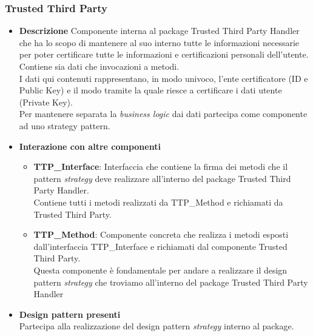 \subsubsection{Trusted Third Party}
\begin{itemize}
	\item \textbf{Descrizione}
	Componente interna al package Trusted Third Party Handler che ha lo scopo di mantenere al suo interno tutte le informazioni necessarie per poter certificare tutte le informazioni e certificazioni personali dell'utente.\\
	Contiene sia dati che invocazioni a metodi.\\
	I dati qui contenuti rappresentano, in modo univoco, l'ente certificatore (ID e Public Key) e il modo tramite la quale riesce a certificare i dati utente (Private Key).\\
	Per mantenere separata la \textit{business logic} dai dati partecipa come componente ad uno strategy pattern.
	\item \textbf{Interazione con altre componenti}
	\begin{itemize}
		\item \textbf{TTP\_Interface}: Interfaccia che contiene la firma dei metodi che il pattern \textit{strategy} deve realizzare all'interno del package Trusted Third Party Handler.\\
		Contiene tutti i metodi realizzati da TTP\_Method e richiamati da Trusted Third Party.		
		\item \textbf{TTP\_Method}: Componente concreta che realizza i metodi esposti dall'interfaccia TTP\_Interface e richiamati dal componente Trusted Third Party.\\
		Questa componente è fondamentale per andare a realizzare il design pattern \textit{strategy} che troviamo all'interno del package Trusted Third Party Handler
	\end{itemize}
	\item \textbf{Design pattern presenti}\\
	Partecipa alla realizzazione del design pattern \textit{strategy} interno al package.
\end{itemize}
